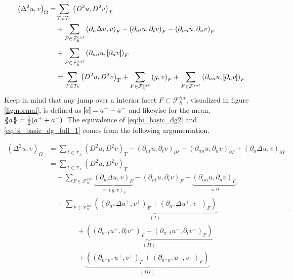 \begin{equation}
\label{eq:bi_basic_dg_full_1}
\begin{split}
\left( \Delta  ^{2} u, v \right) _{\Omega } =& \sum_{T \in  \mathcal{T} _{h}}^{} \left( D^2u, D^2v \right)_{T}    \\
& + \sum_{F \in \mathcal{F}_{h}^{ext}}  \left(\partial _{n} \Delta u, v  \right) _{F} - \left(\partial _{nt} u, \partial _{t} v \right) _{F}-
\left( \partial _{nn} u, \partial _{n} v \right)_{F}  \\
& + \sum_{F \in \mathcal{F}_{h}  ^{int}}^{} \left(\partial _{nn} u , \jump{ \partial _{n} v }
\right)_{F} \\
& = \sum_{T \in  \mathcal{T} _{h}}^{} \left( D^2u, D^2v \right)_{T} + \sum_{F \in
\mathcal{F} ^{ext}_{h}}^{} \left(g, v  \right) _{F}
  + \sum_{F \in \mathcal{F}  ^{int}}^{} \left( \partial _{nn} u , \jump{ \partial_{n} v } \right)_{F}
\end{split}
\end{equation}
Keep in mind that any jump over a interior facet $F \subset \mathcal{F} _{h}^{int}   $, visualized in figure \ref{fig:normal}, is defined as $\left[\!\!\left[  a  \right]\!\!\right] =    a^{+} - a^{-} $
and likewise for the mean, $\left\{\!\!\left\{ a  \right\}\!\!\right\} = \frac{1}{2}(   a^{+}
+ a^{-})$.    The equivalence of \eqref{eq:bi_basic_dg2} and \eqref{eq:bi_basic_dg_full_1} comes from the following argumentation.

\begin{equation*}
    \begin{split}
 \left( \Delta  ^{2} u,v \right) _{\Omega } & =\sum_{T\in \mathcal{T} _{h}}^{} \left( D^2u,D^2v \right) _{T } - \left(\partial _{nt} u, \partial _{t}v
\right)_{\partial T} - \left(\partial _{nn} u, \partial _{n}v \right)_{\partial T} + \left(\partial _{n} \Delta  u,v
\right)_{\partial T} \\
&= \sum_{T\in \mathcal{T} _{h}}^{} \left( D^2u,D^2v \right) _{T } \\
&  \quad + \sum_{F \in \mathcal{F}_{h}^{ext} }^{} \underbrace{\left( \partial _{n} \Delta  u, v  \right)_{F}}_{= \left( g,v \right)_{F} }  -  \left(
\partial _{nt} u, \partial _{t} v \right) _{F}  - \underbrace{\left( \partial _{nn} u, \partial _{n} v \right)_{F}}_{ = 0}    \\
& \quad  + \sum_{F \in \mathcal{F} _{h}^{int}}^{} \underbrace{\left( \left(\partial _{n^{+}} \Delta  u^{+}
        ,v^{+}\right)_{F}
+ \left(\partial _{n^{-}} \Delta  u^{+} ,v^{-}\right)_{F}  \right)}_{(I)} \\
 & \quad \quad \quad  \quad +
\underbrace{\left( \left(\partial _{n^{+}t} u^{+}, \partial_{t} v^{+} \right)_{F} +  \left(\partial _{n^{-}t} u^{-},
        \partial_{t} v^{-}
\right)_{F}  \right) }_{(II)} \\
 & \quad \quad \quad  \quad  +
\underbrace{\left( \left(\partial _{n^{+}n^{+}} u^{+}, v^{+} \right) _{F} + \left(\partial _{n^{-}n^{-}} u^{-}, v^{-}
\right) _{F} \right) }_{(III)}
    \end{split}
.\end{equation*}

